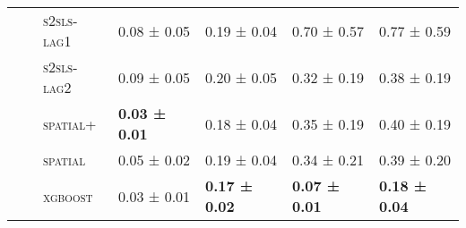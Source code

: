 \documentclass{article}
\begin{document}
\begin{table}[!tbp]
\begin{tabular}{lllllll}
 &  & \textsc{s2sls-lag1} & 0.08 ± {\small 0.05} & 0.19 ± {\small 0.04} & 0.70 ± {\small 0.57} & 0.77 ± {\small 0.59} \\
 &  & \textsc{s2sls-lag2} & 0.09 ± {\small 0.05} & 0.20 ± {\small 0.05} & 0.32 ± {\small 0.19} & 0.38 ± {\small 0.19} \\
 &  & \textsc{spatial+} & \bf 0.03 ± {\small 0.01} & 0.18 ± {\small 0.04} & 0.35 ± {\small 0.19} & 0.40 ± {\small 0.19} \\
 &  & \textsc{spatial} & 0.05 ± {\small 0.02} & 0.19 ± {\small 0.04} & 0.34 ± {\small 0.21} & 0.39 ± {\small 0.20} \\
 &  & \textsc{xgboost} & 0.03 ± {\small 0.01} & \bf 0.17 ± {\small 0.02} & \bf 0.07 ± {\small 0.01} & \bf 0.18 ± {\small 0.04} \\
\cline{1-7} \cline{2-7}
\bottomrule
\end{tabular}

\end{table}
\end{document}
